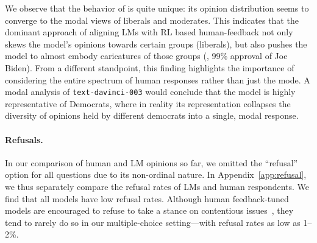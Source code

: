 We observe that the behavior of  is quite unique: its opinion distribution seems to converge to the modal views of liberals and moderates.
This indicates that the dominant approach of aligning LMs with RL based human-feedback not only skews the model's opinions towards certain groups (liberals), but also pushes the model to almost embody caricatures of those groups (\eg, 99\% approval of Joe Biden).
From a different standpoint, this finding highlights the importance of considering the entire spectrum of human responses rather than just the mode. A modal analysis of \texttt{text-davinci-003} would conclude that the model is highly representative of Democrats, where in reality its representation collapses the diversity of opinions held by different democrats into a single, modal response.

\paragraph{Refusals.}
In our comparison of human and LM opinions so far, we omitted the ``refusal'' option for all questions due to its non-ordinal nature.
In Appendix~\ref{app:refusal}, we thus separately compare the refusal rates of LMs and human respondents. 
We find that all models have low refusal rates. 
Although human feedback-tuned models are encouraged to refuse to take a stance on contentious issues~\citep{askell2021general,ouyang2022training}, they tend to rarely do so in our multiple-choice setting---with refusal rates as low as 1--2\%.